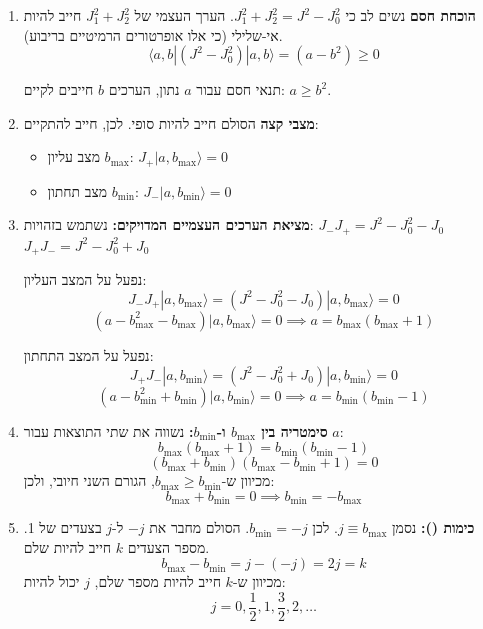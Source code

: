 \begin{enumerate}
    \item \textbf{הוכחת חסם  }
    נשים לב כי $J_1^2 + J_2^2 = J^2 - J_0^2$.
    הערך העצמי של $J_1^2 + J_2^2$ חייב להיות אי-שלילי (כי אלו אופרטורים הרמיטיים בריבוע).
    $$ \langle a, b | (J^2 - J_0^2) | a, b \rangle = (a - b^2) \ge 0 $$
    \begin{importantbox}{תנאי חסם}
    עבור $a$ נתון, הערכים $b$ חייבים לקיים: $a \ge b^2$.
    \end{importantbox}
    
    \item \textbf{מצבי קצה  }
    הסולם חייב להיות סופי. לכן, חייב להתקיים:
    \begin{itemize}
        \item מצב עליון $b_{\text{max}}$: $J_+ |a, b_{\text{max}}\rangle = 0$
        \item מצב תחתון $b_{\text{min}}$: $J_- |a, b_{\text{min}}\rangle = 0$
    \end{itemize}
    
    \item \textbf{מציאת הערכים העצמיים המדויקים:}
    נשתמש בזהויות:
    $J_- J_+ = J^2 - J_0^2 - J_0$
    $J_+ J_- = J^2 - J_0^2 + J_0$
    
    נפעל על המצב העליון:
    $$ J_- J_+ |a, b_{\text{max}}\rangle = (J^2 - J_0^2 - J_0) |a, b_{\text{max}}\rangle = 0 $$
    $$ (a - b_{\text{max}}^2 - b_{\text{max}}) |a, b_{\text{max}}\rangle = 0 \implies \boxed{a = b_{\text{max}}(b_{\text{max}} + 1)} $$
    
    נפעל על המצב התחתון:
    $$ J_+ J_- |a, b_{\text{min}}\rangle = (J^2 - J_0^2 + J_0) |a, b_{\text{min}}\rangle = 0 $$
    $$ (a - b_{\text{min}}^2 + b_{\text{min}}) |a, b_{\text{min}}\rangle = 0 \implies \boxed{a = b_{\text{min}}(b_{\text{min}} - 1)} $$
    
    \item \textbf{סימטריה בין $b_{\text{max}}$ ו-$b_{\text{min}}$:}
    נשווה את שתי התוצאות עבור $a$:
    $$ b_{\text{max}}(b_{\text{max}} + 1) = b_{\text{min}}(b_{\text{min}} - 1) $$
    $$ (b_{\text{max}} + b_{\text{min}})(b_{\text{max}} - b_{\text{min}} + 1) = 0 $$
    מכיוון ש-$b_{\text{max}} \ge b_{\text{min}}$, הגורם השני חיובי, ולכן:
    $$ b_{\text{max}} + b_{\text{min}} = 0 \implies \boxed{b_{\text{min}} = -b_{\text{max}}} $$
    
    \item \textbf{כימות ():}
    נסמן $j \equiv b_{\text{max}}$. לכן $b_{\text{min}} = -j$.
    הסולם מחבר את $-j$ ל-$j$ בצעדים של 1. מספר הצעדים $k$ חייב להיות שלם.
    $$ b_{\text{max}} - b_{\text{min}} = j - (-j) = 2j = k $$
    מכיוון ש-$k$ חייב להיות מספר שלם, $j$ יכול להיות:
    $$ j = 0, \frac{1}{2}, 1, \frac{3}{2}, 2, \dots $$
\end{enumerate}

